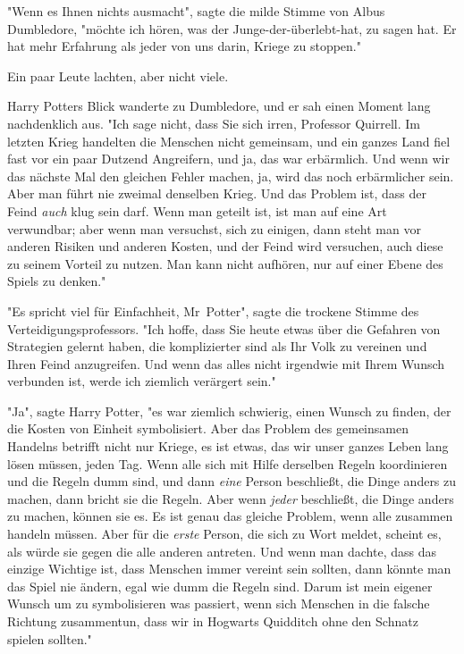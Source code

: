 {"Wenn es Ihnen nichts ausmacht", sagte die milde Stimme von Albus Dumbledore, "möchte ich hören, was der Junge-der-überlebt-hat, zu sagen hat. Er hat mehr Erfahrung als jeder von uns darin, Kriege zu stoppen."

Ein paar Leute lachten, aber nicht viele.

Harry Potters Blick wanderte zu Dumbledore, und er sah einen Moment lang nachdenklich aus. "Ich sage nicht, dass Sie sich irren, Professor Quirrell. Im letzten Krieg handelten die Menschen nicht gemeinsam, und ein ganzes Land fiel fast vor ein paar Dutzend Angreifern, und ja, das war erbärmlich. Und wenn wir das nächste Mal den gleichen Fehler machen, ja, wird das noch erbärmlicher sein. Aber man führt nie zweimal denselben Krieg. Und das Problem ist, dass der Feind \emph{auch} klug sein darf. Wenn man geteilt ist, ist man auf eine Art verwundbar; aber wenn man versuchst, sich zu einigen, dann steht man vor anderen Risiken und anderen Kosten, und der Feind wird versuchen, auch diese zu seinem Vorteil zu nutzen. Man kann nicht aufhören, nur auf einer Ebene des Spiels zu denken."

"Es spricht viel für Einfachheit, Mr~Potter", sagte die trockene Stimme des Verteidigungsprofessors. "Ich hoffe, dass Sie heute etwas über die Gefahren von Strategien gelernt haben, die komplizierter sind als Ihr Volk zu vereinen und Ihren Feind anzugreifen. Und wenn das alles nicht irgendwie mit Ihrem Wunsch verbunden ist, werde ich ziemlich verärgert sein."

"Ja", sagte Harry Potter, "es war ziemlich schwierig, einen Wunsch zu finden, der die Kosten von Einheit symbolisiert. Aber das Problem des gemeinsamen Handelns betrifft nicht nur Kriege, es ist etwas, das wir unser ganzes Leben lang lösen müssen, jeden Tag. Wenn alle sich mit Hilfe derselben Regeln koordinieren und die Regeln dumm sind, und dann \emph{eine} Person beschließt, die Dinge anders zu machen, dann bricht sie die Regeln. Aber wenn \emph{jeder} beschließt, die Dinge anders zu machen, können sie es. Es ist genau das gleiche Problem, wenn alle zusammen handeln müssen. Aber für die \emph{erste} Person, die sich zu Wort meldet, scheint es, als würde sie gegen die alle anderen antreten. Und wenn man dachte, dass das einzige Wichtige ist, dass Menschen immer vereint sein sollten, dann könnte man das Spiel nie ändern, egal wie dumm die Regeln sind. Darum ist mein eigener Wunsch um zu symbolisieren was passiert, wenn sich Menschen in die falsche Richtung zusammentun, dass wir in Hogwarts Quidditch ohne den Schnatz spielen sollten."

}
